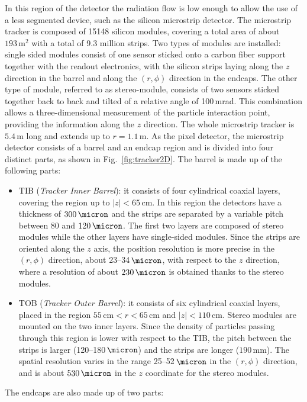 In this region of the detector the radiation flow is low enough to allow the use of a less segmented device, such as the silicon microstrip detector.
The microstrip tracker is composed of 15148 silicon modules, covering a total area of about $193\,\mathrm{m^2}$ with a total of 9.3 million strips. Two types of modules are installed: single sided modules consist of one sensor sticked onto a carbon fiber support together with the readout electronics, with the silicon strips laying along the $z$ direction in the barrel and along the $(r,\phi)$ direction in the endcaps. The other type of module, referred to as stereo-module, consists of two sensors sticked together back to back and tilted of a relative angle of 100\,mrad. This combination allows a three-dimensional measurement of the particle interaction point, providing the information along the $z$ direction. The whole microstrip tracker is $5.4$\,m long and extends up to $r=1.1$\,m. As the pixel detector, the microstrip detector consists of a barrel and an endcap region and is divided into four distinct parts, as shown in Fig.~\ref{fig:tracker2D}. The barrel is made up of the following parts:
\begin{itemize}
\item TIB (\emph{Tracker Inner Barrel}): it consists of four cylindrical coaxial layers, covering the region up to $|z|<65$\,cm. In this region the detectors have a thickness of $300\,\micron$ and the strips are separated by a variable pitch between 80 and $120\,\micron$. The first two layers are composed of stereo modules while the other layers have single-sided modules. Since the strips are oriented along the $z$ axis, the position resolution is more precise in the $(r,\phi)$ direction, about 23--34$\,\micron$, with respect to the $z$ direction, where a resolution of about $230\,\micron$ is obtained thanks to the stereo modules.
\item TOB (\emph{Tracker Outer Barrel}): it consists of six cylindrical coaxial layers, placed in the region $55\,\mathrm{cm} < r < 65\,\mathrm{cm}$ and $|z|<110$\,cm. Stereo modules are mounted on the two inner layers. Since the density of particles passing through this region is lower with respect to the TIB, the pitch between the strips is larger (120--180$\,\micron$) and the strips are longer ($190$\,mm). The spatial resolution varies in the range 25--52$\,\micron$ in the $(r,\phi)$ direction, and is about $530\,\micron$ in the $z$ coordinate for the stereo modules.
\end{itemize}
The endcaps are also made up of two parts:
